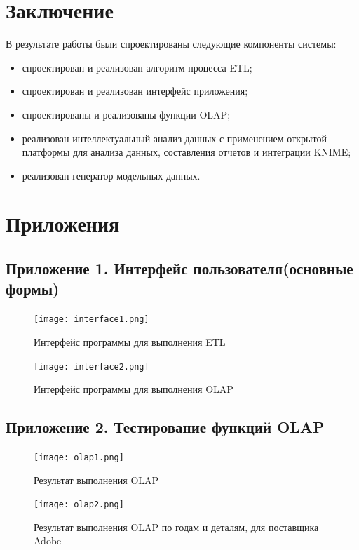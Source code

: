 \section{Заключение}
В результате работы были спроектированы следующие компоненты системы:
\begin{itemize}
  \item спроектирован и реализован алгоритм процесса ETL;
  \item спроектирован и реализован интерфейс приложения;
  \item спроектированы и реализованы функции OLAP;
  \item реализован интеллектуальный анализ данных с применением открытой платформы для анализа данных, составления отчетов и интеграции KNIME;
  \item реализован генератор модельных данных.
\end{itemize}

\newpage
\section{Приложения}
\subsection{Приложение 1. Интерфейс пользователя(основные формы)}

\begin{figure}[h]
  \centering
  \texttt{[image: interface1.png]}
  \caption{Интерфейс программы для выполнения ETL}
  \label{etl-interface}
\end{figure}

\begin{figure}[h]
  \centering
  \texttt{[image: interface2.png]}
  \caption{Интерфейс программы для выполнения OLAP}
  \label{olap-interface}
\end{figure}

\newpage
\subsection{Приложение 2. Тестирование функций OLAP}

\begin{figure}[h]
  \centering
  \texttt{[image: olap1.png]}
  \caption{Результат выполнения OLAP}
  \label{olap-res-2}
\end{figure}

\begin{figure}[h]
  \centering
  \texttt{[image: olap2.png]}
  \caption{Результат выполнения OLAP по годам и деталям, для поставщика Adobe}
  \label{olap-res-1}
\end{figure}

